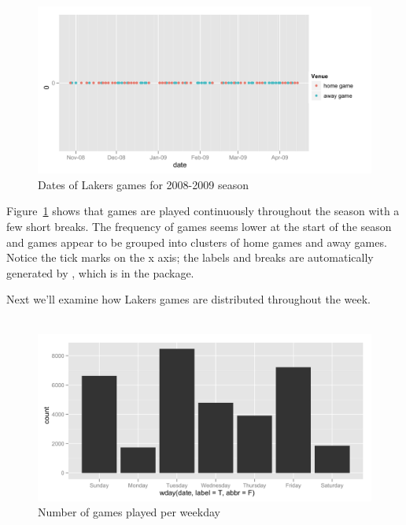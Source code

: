 \documentclass[article]{jss}
\begin{document}
\\
\\

\begin{figure}[htpb]
  \centering
  \includegraphics[width=\textwidth]{dates-points.png}        
  \caption{Dates of Lakers games for 2008-2009 season}
  \label{fig:games-date}
\end{figure}

Figure~\ref{fig:games-date} shows that games are played continuously throughout the season with a few short breaks. The frequency of games seems lower at the start of the season and games appear to be grouped into clusters of home games and away games. Notice the tick marks on the x axis; the labels and breaks are automatically generated by , which is in the  package. 

Next we'll examine how Lakers games are distributed throughout the week.\\

\\

\begin{figure}[htpb]
  \centering    
    \includegraphics[width=\textwidth]{weekdays-histogram.png}     
  \caption{Number of games played per weekday}
  \label{fig:games-days}
\end{figure}
\end{document}
